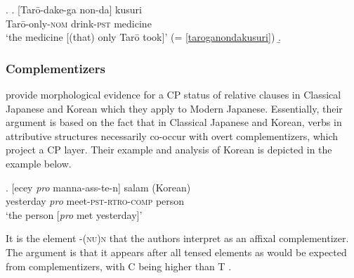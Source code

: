 \documentclass [output=book,colorlinks,citecolor=brown]{langscibook}
\begin{document}
\newpage

\ex. \ag. [Tarō-dake-ga non-da] kusuri\\
Tarō-only-\textsc{nom} drink-\textsc{pst} medicine\\
`the medicine [(that) only Tarō took]’ \null \hfill (= \ref{taroganondakusuri})
\b. \hspace{-2.5cm} 

\subsubsection{Complementizers}

\citet{kaplan:1995:the} provide morphological evidence for a CP status of relative clauses in Classical Japanese and Korean which they apply to Modern Japanese. Essentially, their argument is based on the fact that in Classical Japanese and Korean, verbs in attributive structures necessarily co-occur with overt complementizers, which project a CP layer. Their example and analysis of Korean is depicted in the example below. %


\exg. [ecey \textit{pro} manna-ass-te-n] salam (Korean)\\
yesterday \textit{pro} meet-\textsc{pst-rtro-comp} person\\
`the person [\textit{pro} met yesterday]’ \null \hfill \citep[30]{kaplan:1995:the} %

It is the element -\textsc{(nu)n} that the authors interpret as an affixal complementizer. The argument is that it appears after all tensed elements as would be expected from complementizers, with C being higher than T \citep[30]{kaplan:1995:the}.
\end{document}
